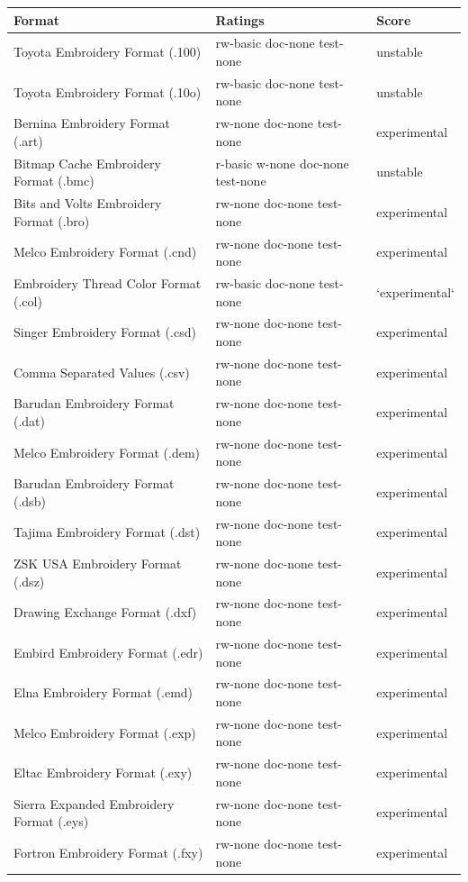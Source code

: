 \documentclass{report}
\begin{document}
\begin{longtable}{l l l}
Format & Ratings & Score \\
\hline
Toyota Embroidery Format (.100) & rw-basic doc-none test-none & unstable \\
Toyota Embroidery Format (.10o) & rw-basic doc-none test-none & unstable \\
Bernina Embroidery Format (.art) & rw-none doc-none test-none & experimental \\
Bitmap Cache Embroidery Format (.bmc) & r-basic w-none doc-none test-none & unstable \\
Bits and Volts Embroidery Format (.bro) & rw-none doc-none test-none & experimental \\
Melco Embroidery Format (.cnd) & rw-none doc-none test-none & experimental \\
Embroidery Thread Color Format (.col) & rw-basic doc-none test-none & `experimental` \\
Singer Embroidery Format (.csd) & rw-none doc-none test-none & experimental \\
Comma Separated Values (.csv) & rw-none doc-none test-none & experimental \\
Barudan Embroidery Format (.dat) & rw-none doc-none test-none & experimental \\ Melco Embroidery Format (.dem) & rw-none doc-none test-none & experimental \\
Barudan Embroidery Format (.dsb) & rw-none doc-none test-none & experimental \\
Tajima Embroidery Format (.dst) & rw-none doc-none test-none & experimental \\
ZSK USA Embroidery Format (.dsz) & rw-none doc-none test-none & experimental \\
Drawing Exchange Format (.dxf) & rw-none doc-none test-none & experimental \\
Embird Embroidery Format (.edr) & rw-none doc-none test-none & experimental \\
Elna Embroidery Format (.emd) & rw-none doc-none test-none & experimental \\
Melco Embroidery Format (.exp) & rw-none doc-none test-none & experimental \\
Eltac Embroidery Format (.exy) & rw-none doc-none test-none & experimental \\
Sierra Expanded Embroidery Format (.eys) & rw-none doc-none test-none & experimental \\
Fortron Embroidery Format (.fxy) & rw-none doc-none test-none & experimental \\

\end{longtable}
\end{document}
